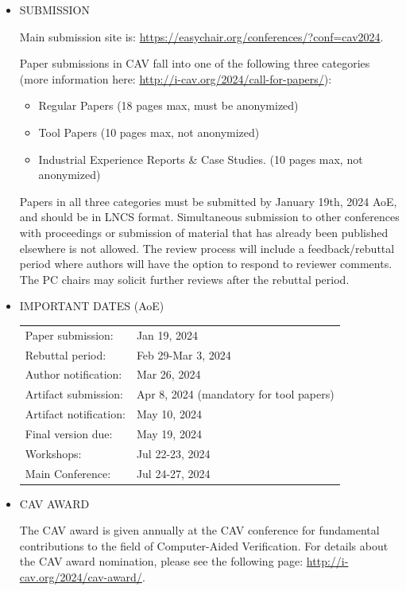 \documentclass[prodmode,acmtecs]{acmsmall} %
\begin{document}
\begin{itemize}
\item  SUBMISSION 
 
  Main submission site is: \href{https://easychair.org/conferences/?conf=cav2024}{https://easychair.org/conferences/?conf=cav2024}.  
 
  Paper submissions in CAV fall into one of the following three categories (more information here: \href{http://i-cav.org/2024/call-for-papers/}{http://i-cav.org/2024/call-for-papers/}): 
 
\begin{itemize}\item  Regular Papers (18 pages max, must be anonymized) 
\item  Tool Papers (10 pages max, not anonymized) 
\item  Industrial Experience Reports \& Case Studies. (10 pages max, not anonymized) 
\end{itemize} 
  Papers in all three categories must be submitted by January 19th, 2024 AoE, and should be in LNCS format. Simultaneous submission to other conferences with proceedings or submission of material that has already been published elsewhere is not allowed. The review process will include a feedback/rebuttal period where authors will have the option to respond to reviewer comments. The PC chairs may solicit further reviews after the rebuttal period.  
 
\item  IMPORTANT DATES (AoE) 
 
\begin{tabulary}{\linewidth}{LL}Paper submission:  & Jan 19, 2024 \\
Rebuttal period:  & Feb 29-Mar 3, 2024 \\
Author notification:  & Mar 26, 2024 \\
Artifact submission:  & Apr 8, 2024 (mandatory for tool papers) \\
Artifact notification:  & May 10, 2024 \\
Final version due:  & May 19, 2024 \\
Workshops:  & Jul 22-23, 2024 \\
Main Conference:  & Jul 24-27, 2024 \\
\end{tabulary}
 
\item  CAV AWARD  
 
  The CAV award is given annually at the CAV conference for fundamental contributions to the field of Computer-Aided Verification. For details about the CAV award nomination, please see the following page: \href{http://i-cav.org/2024/cav-award/}{http://i-cav.org/2024/cav-award/}. 
 

\end{itemize}
\end{document}

